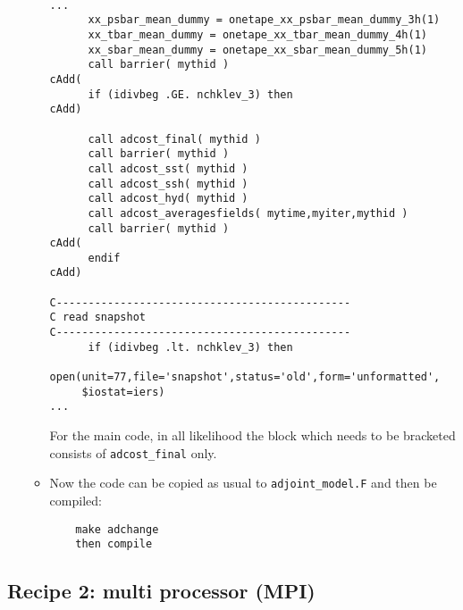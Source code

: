 \begin{enumerate}
\begin{itemize}
{\footnotesize
\begin{verbatim}

...
      xx_psbar_mean_dummy = onetape_xx_psbar_mean_dummy_3h(1)
      xx_tbar_mean_dummy = onetape_xx_tbar_mean_dummy_4h(1)
      xx_sbar_mean_dummy = onetape_xx_sbar_mean_dummy_5h(1)
      call barrier( mythid )
cAdd(
      if (idivbeg .GE. nchklev_3) then
cAdd)

      call adcost_final( mythid )
      call barrier( mythid )
      call adcost_sst( mythid )
      call adcost_ssh( mythid )
      call adcost_hyd( mythid )
      call adcost_averagesfields( mytime,myiter,mythid )
      call barrier( mythid )
cAdd(
      endif
cAdd)

C----------------------------------------------
C read snapshot
C----------------------------------------------
      if (idivbeg .lt. nchklev_3) then
        open(unit=77,file='snapshot',status='old',form='unformatted',
     $iostat=iers)
...

\end{verbatim}
}

For the main code, in all likelihood the block which needs to
be bracketed consists of {\tt adcost\_final} only.

\item
Now the code can be copied as usual to {\tt adjoint\_model.F}
and then be compiled:
%
{\footnotesize
\begin{verbatim}
    make adchange
    then compile
\end{verbatim}
}

\end{itemize}

\end{enumerate}

\subsection{Recipe 2: multi processor (MPI)}


